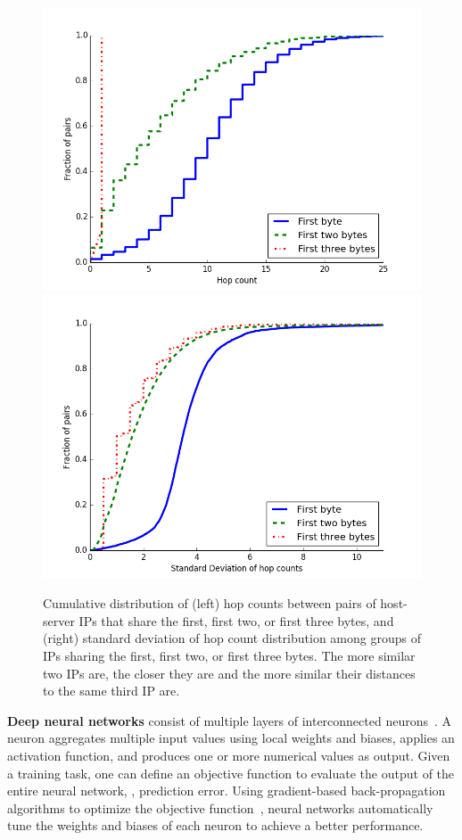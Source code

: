 \begin{figure}[t]
	\includegraphics[width=.45\linewidth]{Graph/dip/hopcountbybyte.png}
	\includegraphics[width=.45\linewidth]{Graph/dip/hopcountSDbyprefix.png}
	\caption{Cumulative distribution of (left) hop counts between pairs of host-server IPs that share the first, first two, or first three bytes, and (right) standard deviation of hop count distribution among groups of IPs sharing the first, first two, or first three bytes. The more similar two IPs are, the closer they are and the more similar their distances to the same third IP are.}
	\label{fig:difference}
\end{figure}


\textbf{Deep neural networks} consist of multiple layers of interconnected neurons~\citep{lecun2015deep}. A neuron aggregates multiple input values using local weights and biases, applies an activation function, and produces one or more numerical values as output. 
%
Given a training task, one can define an objective function to evaluate the output of the entire neural network, \eg{}, prediction error. 
%
Using gradient-based back-propagation algorithms to optimize the objective function~\citep{kingma2014adam}, neural networks automatically tune the weights and biases of each neuron to achieve a better performance.


